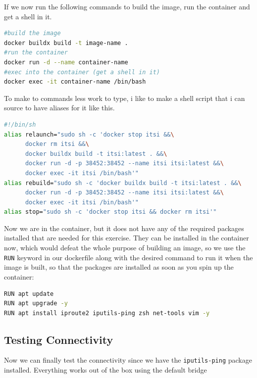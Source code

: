 \documentclass[a4paper]{article}
\begin{document}
If we now run the following commands to build the image, run the container and get a shell in it.
\begin{lstlisting}[language=bash]
#build the image
docker buildx build -t image-name .
#run the container
docker run -d --name container-name 
#exec into the container (get a shell in it)
docker exec -it container-name /bin/bash
\end{lstlisting}
To make to commands less work to type, i like to make a shell script that i can source to have aliases for it like this.
\begin{lstlisting}[language=bash]
#!/bin/sh
alias relaunch="sudo sh -c 'docker stop itsi &&\
      docker rm itsi &&\
      docker buildx build -t itsi:latest . &&\
      docker run -d -p 38452:38452 --name itsi itsi:latest &&\
      docker exec -it itsi /bin/bash'"
alias rebuild="sudo sh -c 'docker buildx build -t itsi:latest . &&\
      docker run -d -p 38452:38452 --name itsi itsi:latest &&\
      docker exec -it itsi /bin/bash'"
alias stop="sudo sh -c 'docker stop itsi && docker rm itsi'"
\end{lstlisting}
Now we are in the container, but it does not have any of the required packages installed that are needed for this exercise. They can be installed in the container now, which would defeat the whole purpose of building an image, so we use the \texttt{RUN} keyword in our dockerfile along with the desired command to run it when the image is built, so that the packages are installed as soon as you spin up the container:
\begin{lstlisting}[language=bash]
RUN apt update 
RUN apt upgrade -y
RUN apt install iproute2 iputils-ping zsh net-tools vim -y
\end{lstlisting}
\newpage
\subsection{Testing Connectivity}
Now we can finally test the connectivity since we have the \texttt{iputils-ping} package installed. Everything works out of the box using the default bridge \cite{Docker-bridge}
\end{document}

